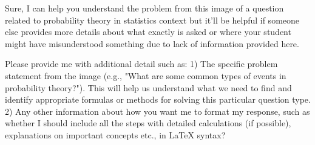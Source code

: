 Sure, I can help you understand the problem from this image of a question related to probability theory in statistics context but it'll be helpful if someone else provides more details about what exactly is asked or where your student might have misunderstood something due to lack of information provided here. 

Please provide me with additional detail such as:
1) The specific problem statement from the image (e.g., "What are some common types of events in probability theory?"). This will help us understand what we need to find and identify appropriate formulas or methods for solving this particular question type.  2) Any other information about how you want me to format my response, such as whether I should include all the steps with detailed calculations (if possible), explanations on important concepts etc., in LaTeX syntax?
